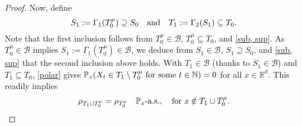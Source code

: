 \documentclass[11pt,reqno]{article}
\numberwithin{equation}{section}
\renewcommand{\P}{\mathbb{P}}
\newcommand{\R}{\mathbb{R}}
\newcommand{\N}{\mathbb{N}}
\newcommand{\B}{\mathcal{B}}
\begin{document}
\begin{proof}
Now, define
\[
S_1:=\Gamma_1(T_0^\mu)\supseteq S_0\quad \hbox{and}\quad T_1:=\Gamma_2(S_1)\subseteq T_0. 
\]
Note that the first inclusion follows from $T_0^\mu\in\B$, $T_0^\mu\subseteq T_0$, and \eqref{sub, sup}. As $T_0^\mu\in\B$ implies $S_1:=\Gamma_1(T_0^\mu)\in\B$, we deduce from $S_1\in\B$, $S_1\supseteq S_0$, and \eqref{sub, sup} that the second inclusion above holds. With $T_1\in\B$ (thanks to $S_1\in\B$) and $T_1\subseteq T_0$, \eqref{polar} gives $\P_x(X_t\in T_1\setminus T_0^{\mu}\ \hbox{for some $t\in\N$}) =0$ for all $x\in\R^d$. This readily implies 
\begin{equation}\label{123'}
\rho_{T_1\cup T_0^\mu} = \rho_{T_0^\mu}\quad\P_x\hbox{-a.s.},\quad \hbox{for}\ x\notin T_1\cup T^\mu_0. 
\end{equation}


\end{proof}
\end{document}
